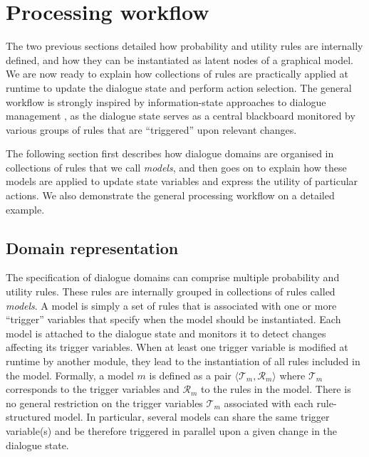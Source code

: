 
%

\section{Processing workflow}
\label{sec:processing-workflow}

The two previous sections detailed how probability and utility rules are internally defined, and how they can be instantiated as latent nodes of a graphical model. We are now ready to explain how collections of rules are practically applied at runtime to update the dialogue state and perform action selection. The general workflow is strongly inspired by information-state approaches to dialogue management \citep{Larsson:2000}, as the dialogue state serves as a central blackboard monitored by various groups of rules that are ``triggered'' upon relevant changes. 

The following section first describes how dialogue domains are organised in collections of rules that we call \textit{models}, and then goes on to explain how these models are applied to update state variables and express the utility of particular actions. We also demonstrate the general processing workflow on a detailed example. 


\subsection{Domain representation}

The specification of dialogue domains can comprise multiple probability and utility rules. These rules are internally grouped in collections of rules called \textit{models}. A model is simply a set of rules that is associated with one or more ``trigger'' variables that specify when the model should be instantiated. Each model is attached to the dialogue state and monitors it to detect changes affecting its trigger variables. When at least one trigger variable is modified at runtime by another module, they lead to the instantiation of all rules included in the model. Formally, a model $m$ is defined as a pair $\langle \mathcal{T}_m, \mathcal{R}_m \rangle$ where $\mathcal{T}_m$ corresponds to the trigger variables and $\mathcal{R}_m$ to the rules in the model.  There is no general restriction on the trigger variables $\mathcal{T}_m$ associated with each rule-structured model.  In particular, several models can share the same trigger variable(s) and be therefore triggered in parallel upon a given change in the dialogue state. 

